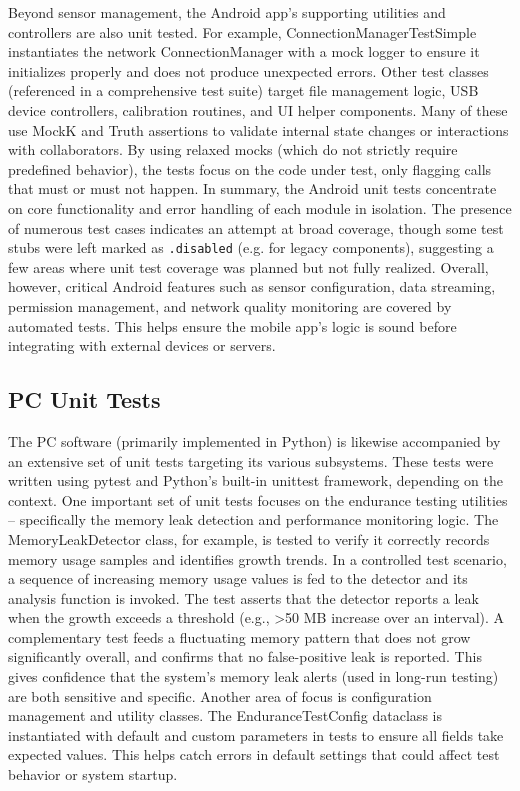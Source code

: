 Beyond sensor management, the Android app's supporting utilities and controllers are also unit tested. For example, ConnectionManagerTestSimple instantiates the network ConnectionManager with a mock logger to ensure it initializes properly and does not produce unexpected errors. Other test classes (referenced in a comprehensive test suite) target file management logic, USB device controllers, calibration routines, and UI helper components. Many of these use MockK and Truth assertions to validate internal state changes or interactions with collaborators. By using relaxed mocks (which do not strictly require predefined behavior), the tests focus on the code under test, only flagging calls that must or must not happen. In summary, the Android unit tests concentrate on core functionality and error handling of each module in isolation. The presence of numerous test cases indicates an attempt at broad coverage, though some test stubs were left marked as \texttt{.disabled} (e.g. for legacy components), suggesting a few areas where unit test coverage was planned but not fully realized. Overall, however, critical Android features such as sensor configuration, data streaming, permission management, and network quality monitoring are covered by automated tests. This helps ensure the mobile app's logic is sound before integrating with external devices or servers.

\subsection{PC Unit Tests}

The PC software (primarily implemented in Python) is likewise accompanied by an extensive set of unit tests targeting its various subsystems. These tests were written using pytest and Python's built-in unittest framework, depending on the context. One important set of unit tests focuses on the endurance testing utilities – specifically the memory leak detection and performance monitoring logic. The MemoryLeakDetector class, for example, is tested to verify it correctly records memory usage samples and identifies growth trends. In a controlled test scenario, a sequence of increasing memory usage values is fed to the detector and its analysis function is invoked. The test asserts that the detector reports a leak when the growth exceeds a threshold (e.g., >50 MB increase over an interval). A complementary test feeds a fluctuating memory pattern that does not grow significantly overall, and confirms that no false-positive leak is reported. This gives confidence that the system's memory leak alerts (used in long-run testing) are both sensitive and specific. Another area of focus is configuration management and utility classes. The EnduranceTestConfig dataclass is instantiated with default and custom parameters in tests to ensure all fields take expected values. This helps catch errors in default settings that could affect test behavior or system startup.

